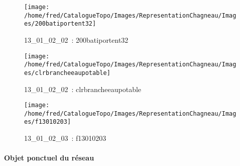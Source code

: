 \documentclass[12pt,titlepage]{book}
\begin{document}
\begin{figure}[h!]
  \begin{minipage}[t]{3cm}
    \begin{center}
      \texttt{[image: /home/fred/CatalogueTopo/Images/RepresentationChagneau/Images/200batiportent32]}
      \caption[~13\_01\_02\_02]{\small{13\_01\_02\_02~:} \tiny{200batiportent32}}\label{200batiportent32}
    \end{center}
  \end{minipage}
  \begin{minipage}[t]{3cm}
    \begin{center}
      \texttt{[image: /home/fred/CatalogueTopo/Images/RepresentationChagneau/Images/clrbrancheeaupotable]}
      \caption[~13\_01\_02\_02]{\small{13\_01\_02\_02~:} \tiny{clrbrancheeaupotable}}\label{clrbrancheeaupotable}
    \end{center}
  \end{minipage}
  \begin{minipage}[t]{3cm}
    \begin{center}
      \texttt{[image: /home/fred/CatalogueTopo/Images/RepresentationChagneau/Images/f13010203]}
      \caption[~13\_01\_02\_03]{\small{13\_01\_02\_03~:} \tiny{f13010203}}\label{f13010203}
    \end{center}
  \end{minipage}
\end{figure}


\paragraph{Objet ponctuel du réseau}
\noindent
\vspace{\baselineskip}
\end{document}
